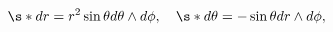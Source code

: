 \begin{equation}
 \s* dr = r^2 \sin \theta d\theta \wedge d\phi, \quad
 \s* d\theta = -\sin \theta dr \wedge d\phi,
\end{equation}

